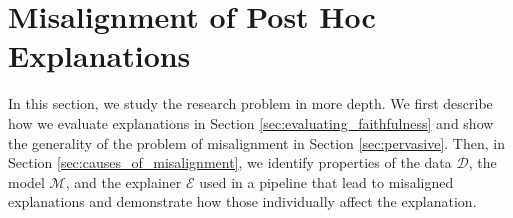 \documentclass[12pt]{article}  %
\newcommand{\mD}{\mathcal{D}}
\newcommand{\mM}{\mathcal{M}}
\newcommand{\mE}{\mathcal{E}}
\begin{document}
     





\section{Misalignment of Post Hoc Explanations}
\label{sec:misalignment}
  In this section, we study the research problem in more depth. We first describe how we evaluate explanations in Section \ref{sec:evaluating_faithfulness} and show the generality of the problem of misalignment in Section \ref{sec:pervasive}. 
  Then, in Section \ref{sec:causes_of_misalignment}, we identify properties of the data $\mD$, the model $\mM$, and the explainer $\mE$ used in a pipeline that lead to misaligned explanations and demonstrate how those individually affect the explanation.  %
\end{document}
